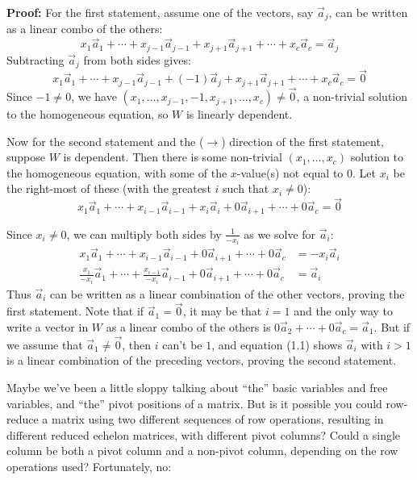 \documentclass[11pt, letterpaper]{report}
\newenvironment{book}{}{}
\begin{document}
\begin{book}
\textbf{Proof:} For the first statement, assume one of the vectors, say $\vec{a}_j$, can be written as a linear combo of the others: \[x_1\vec{a}_1 + \cdots + x_{j-1}\vec{a}_{j-1} + x_{j+1}\vec{a}_{j+1} + \cdots + x_{c}\vec{a}_{c} = \vec{a}_j\]
Subtracting $\vec{a}_j$ from both sides gives:
\[x_1\vec{a}_1 + \cdots + x_{j-1}\vec{a}_{j-1} + (-1)\vec{a}_j+ x_{j+1}\vec{a}_{j+1} + \cdots + x_{c}\vec{a}_{c} = \vec{0}\]
Since $-1 \ne 0$, we have $( x_1, \ldots, x_{j-1}, -1, x_{j+1}, \ldots ,x_{c} ) \ne \vec{0}$,  a non-trivial solution to the homogeneous equation, so $W$ is linearly dependent.

Now for the second statement and the ($\rightarrow$) direction of the first statement, suppose $W$ is dependent. Then there is some non-trivial $(x_1,\ldots, x_c)$ solution to the homogeneous equation, with some of the $x$-value(s) not equal to $0$. Let $x_i$ be the right-most of these (with the greatest $i$ such that $x_i \ne 0$):
\[x_1\vec{a}_1 + \cdots + x_{i-1}\vec{a}_{i-1} + x_i\vec{a}_i + 0\vec{a}_{i+1} + \cdots + 0\vec{a}_c = \vec{0} \]

Since $x_i\ne 0$, we can multiply both sides by $\frac{1}{-x_i}$ as we solve for $\vec{a}_{i}$:
\begin{align}
\label{eq:1.4characterization-thm}
x_1\vec{a}_1 + \cdots + x_{i-1}\vec{a}_{i-1}  + 0\vec{a}_{i+1} + \cdots + 0\vec{a}_c &= -x_i\vec{a}_i \nonumber \\
\frac{x_1}{-x_i}\vec{a}_1 + \cdots + \frac{x_{i-1}}{-x_i}\vec{a}_{i-1}  + 0\vec{a}_{i+1} + \cdots + 0\vec{a}_c &= \vec{a}_i
\end{align}
Thus $\vec{a}_i$ can be written as a linear combination of the other vectors, proving the first statement. Note that if $\vec{a}_1=\vec{0}$, it may be that $i=1$ and the only way to write a vector in $W$ as a linear combo of the others is $0\vec{a}_{2} + \cdots + 0\vec{a}_c = \vec{a}_{1}$. But if we assume that $\vec{a}_1 \ne \vec{0}$, then $i$ can't be $1$, and equation (1.1) shows $\vec{a}_i$ with $i>1$ is a linear combination of the preceding vectors, proving the second statement. \blacksquare

\end{book}

Maybe we've been a little sloppy talking about ``the'' basic variables and free variables, and ``the'' pivot positions of a matrix. But is it possible you could row-reduce a matrix using two different sequences of row operations, resulting in different reduced echelon matrices, with different pivot columns? Could a single column be both a pivot column and a non-pivot column, depending on the row operations used? Fortunately, no:
\end{document}
